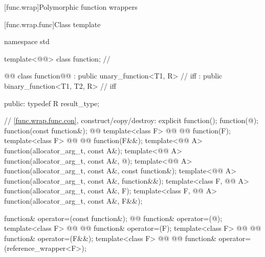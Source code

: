 \documentclass[american,twoside]{book}
\begin{document}
[func.wrap]{\marktr{}Polymorphic function wrappers}
%

\setcounter{subsubsection}{1}
[func.wrap.func]{Class template }

\begin{codeblock}
namespace std {
  template<@@> class function; // 

  @@
  class function@@ 
    : public unary_function<T1, R>      // iff 
    : public binary_function<T1, T2, R> // iff 
  {
  public:
    typedef R result_type;

    // \ref{func.wrap.func.con}, construct/copy/destroy:
    explicit function();
    function(@\unspecnull@);
    function(const function&);
    @@
    template<class F> 
      @@
            @@
      function(F);
    template<class F> 
      @@ 
            @@
      function(F&&);
    template<@@ A> 
      function(allocator_arg_t, const A&);
    template<@@ A> function(allocator_arg_t, const A&,
      @\unspecnull@);
    template<@@ A> function(allocator_arg_t, const A&,
      const function&);
    template<@@ A> function(allocator_arg_t, const A&,
      function&&);
    template<class F, @@ A> function(allocator_arg_t, const A&, F);
    template<class F, @@ A> function(allocator_arg_t, const A&, F&&);

    function& operator=(const function&);
    @@
    function& operator=(@\unspecnull@);
    template<class F> 
      @@ 
            @@
      function& operator=(F);
    template<class F> 
      @@ 
            @@
      function& operator=(F&&);
    template<class F> 
      @@ 
            @@
      function& operator=(reference_wrapper<F>);

}}
\end{codeblock}
\end{document}
